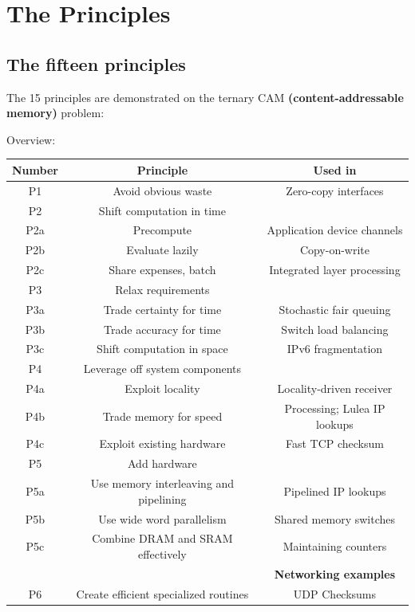 \chapter{The Principles} \label{CHAP:PRINCIPLES}

\section{The fifteen principles}

The 15 principles are demonstrated on the ternary CAM \textbf{(content-addressable memory)} problem:

Overview:

\begin{tabular}{|c|c|c|}
\hline 
\textbf{Number} & \textbf{Principle} & \textbf{Used in} \\ 
\hline 
P1 & Avoid obvious waste & Zero-copy interfaces \\ 
\hline 
P2 & Shift computation in time &  \\ 
P2a & Precompute & Application device channels \\ 
P2b & Evaluate lazily & Copy-on-write \\ 
P2c & Share expenses, batch & Integrated layer processing \\ 
\hline 
P3 & Relax requirements &  \\ 
P3a & Trade certainty for time & Stochastic fair queuing \\ 
P3b & Trade accuracy for time & Switch load balancing \\ 
P3c & Shift computation in space & IPv6 fragmentation \\ 
\hline 
P4 & Leverage off system components &  \\ 
P4a & Exploit locality & Locality-driven receiver \\
P4b & Trade memory for speed & Processing; Lulea IP lookups \\
P4c & Exploit existing hardware & Fast TCP checksum \\
\hline 
P5 & Add hardware &  \\ 
P5a & Use memory interleaving and pipelining & Pipelined IP lookups \\ 
P5b & Use wide word parallelism & Shared memory switches \\ 
P5c & Combine DRAM and SRAM effectively & Maintaining counters \\ 
\hline 
 &  & \textbf{Networking examples} \\ 
\hline 
P6 & Create efficient specialized routines & UDP Checksums \\ 

\end{tabular}
